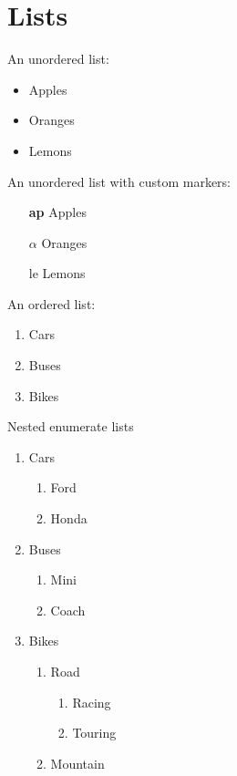 \section{Lists}

An unordered list:
\begin{itemize}
\item Apples\label{fru:afal}
\item Oranges\label{fru:oren}
\item Lemons
\end{itemize}

An unordered list with custom markers:
\begin{itemize}
\item[\bf ap] Apples
\item[$\alpha$] Oranges
\item[le] Lemons
\end{itemize}

An ordered list:
\begin{enumerate}
\item Cars
\item Buses
\item Bikes
\end{enumerate}

Nested enumerate lists
\begin{enumerate}
\item Cars
    \begin{enumerate}
    \item Ford
    \item Honda
    \end{enumerate}
\item Buses
    \begin{enumerate}
    \item Mini
    \item Coach
    \end{enumerate}
\item Bikes
    \begin{enumerate}
    \item Road
        \begin{enumerate}
        \item Racing
        \item Touring
        \end{enumerate}
    \item Mountain
    \end{enumerate}
\end{enumerate}

